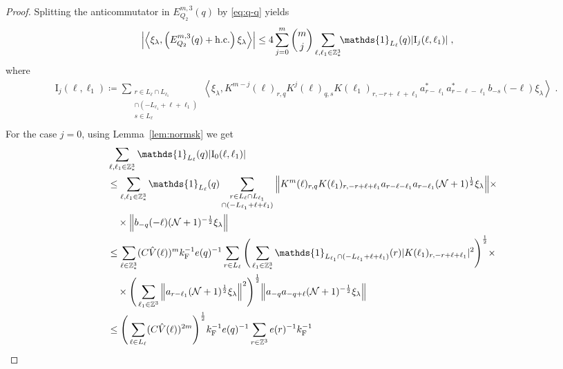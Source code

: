 \documentclass[12pt,a4paper]{article}
\numberwithin{equation}{section}
\newcommand{\1}{\mathbb{I}}
\newcommand{\F}{\mathrm{F}}
\newcommand{\I}{\mathrm{I}}
\newcommand{\Z}{\mathbb{Z}}
\newcommand{\NN}{\mathcal{N}}
\newcommand{\half}{\frac{1}{2}}
\newcommand{\eva}[1]{\left\langle #1 \right\rangle}
\theoremstyle{plain}
\theoremstyle{definition}
\theoremstyle{remark}
\theoremstyle{plain}
\theoremstyle{definition}
\theoremstyle{remark}
\begin{document}
\begin{proof}
Splitting the anticommutator in $ E^{m,3}_{Q_2}(q) $ by \eqref{eq:q-q} yields
\begin{equation} \label{eq:EQ2151}
\begin{aligned}
	&\abs{\eva{\xi_\lambda,\left(E^{m,3}_{Q_2}(q) + \mathrm{h.c.}\right) \xi_\lambda }}
	\le 4 \sum_{j=0}^m {{m}\choose j} \sum_{\ell,\ell_1 \in \Z^3_*}\!\! \mathds{1}_{L_\ell}(q) |\I_j(\ell, \ell_1)| \;,
	\end{aligned}
\end{equation}
where
\begin{equation}
\begin{aligned}
	& \I_j(\ell, \ell_1)
	\coloneq \sum_{\substack{r\in L_{\ell} \cap L_{\ell_1}\\ \cap (-L_{\ell_1}+\ell+\ell_1)\\ s \in L_{\ell}}}
		\eva{\xi_\lambda, K^{m-j}(\ell)_{r,q} K^{j}(\ell)_{q,s} K(\ell_1)_{r,-r+\ell+\ell_1} a^*_{r-\ell_1} a^*_{r-\ell-\ell_1} b_{-s}(-\ell) \xi_\lambda} \;. \\
\end{aligned}
\end{equation}
For the case $j=0$, using Lemma~\ref{lem:normsk} we get
\begin{align}
	&\sum_{\ell,\ell_1 \in \Z^3_*} \mathds{1}_{L_\ell}(q) |\I_0(\ell, \ell_1)| \nonumber\\
	&\leq \sum_{\ell,\ell_1 \in \Z^3_*} \mathds{1}_{L_\ell}(q) \sum\limits_{\substack{r\in L_{\ell} \cap L_{\ell_1} \\ \cap (-L_{\ell_1}+\ell+\ell_1)}}
		\norm{K^m(\ell)_{r,q} K(\ell_1)_{r,-r+\ell+\ell_1} a_{r-\ell-\ell_1} a_{r-\ell_1} (\NN+1)^\half \xi_\lambda} \times \nonumber\\
	&\quad \times \norm{ b_{-q}(-\ell) (\NN+1)^{-\half} \xi_\lambda}\nonumber\\
	&\leq \sum_{\ell \in \Z^3_*} (C \hat{V}(\ell))^m 
		k_{\F}^{-1} e(q)^{-1} \sum\limits_{r \in L_\ell}
		\Bigg( \sum_{\ell_1 \in \Z^3_*} \mathds{1}_{L_{\ell_1} \cap (-L_{\ell_1}+\ell+\ell_1) }(r) |K(\ell_1)_{r,-r+\ell+\ell_1}|^2 \Bigg)^{\half} \times \nonumber\\
	&\quad \times \Bigg( \sum_{\ell_1 \in \Z^3} \norm{a_{r-\ell_1} (\NN+1)^\half \xi_\lambda}^2 \Bigg)^{\half}
		\norm{ a_{-q} a_{-q+\ell} (\NN+1)^{-\half} \xi_\lambda}\nonumber\\
	&\leq \Bigg( \sum_{\ell \in L_\ell} (C \hat{V}(\ell))^{2m} \Bigg)^{\half} 
		k_{\F}^{-1} e(q)^{-1} \sum\limits_{r \in \Z^3} e(r)^{-1} k_{\F}^{-1}

\end{align}
\end{proof}
\end{document}
